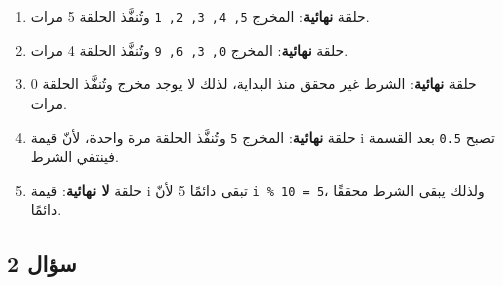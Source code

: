 \documentclass[14pt]{extarticle}
\begin{document}
\ifwithsols
\begin{boxSolution}
\begin{enumerate}[label=\arabic*., itemsep=1em]
    \item حلقة \textbf{نهائية}: المخرج \textenglish{\texttt{5, 4, 3, 2, 1}} وتُنفَّذ الحلقة 5 مرات.
    \item حلقة \textbf{نهائية}: المخرج \textenglish{\texttt{0, 3, 6, 9}} وتُنفَّذ الحلقة 4 مرات.
    \item حلقة \textbf{نهائية}: الشرط غير محقق منذ البداية، لذلك لا يوجد مخرج وتُنفَّذ الحلقة 0 مرات.
    \item حلقة \textbf{نهائية}: المخرج \textenglish{\texttt{5}} وتُنفَّذ الحلقة مرة واحدة، لأنّ قيمة \textenglish{i} تصبح \textenglish{\texttt{0.5}} بعد القسمة فينتفي الشرط.
    \item حلقة \textbf{لا نهائية}: قيمة \textenglish{i} تبقى دائمًا 5 لأنّ \textenglish{\texttt{i \% 10 = 5}}، ولذلك يبقى الشرط محققًا دائمًا.
\end{enumerate}
\end{boxSolution}
\fi

\subsection*{سؤال 2}
\end{document}
